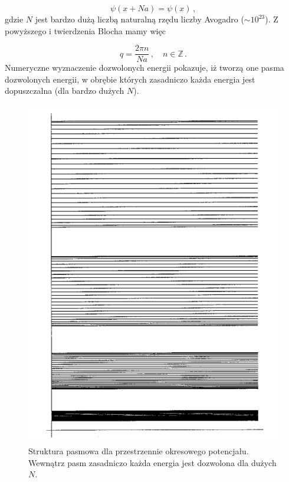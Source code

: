 \documentclass{myclass}
\begin{document}
\begin{equation*}
\psi(x+Na)=\psi(x)\,,
\end{equation*}
gdzie \(N\) jest bardzo dużą liczbą naturalną rzędu liczby Avogadro (\(\sim10^{23}\)). Z powyższego
i twierdzenia Blocha mamy więc

\begin{equation*}
q = \frac{2\pi n}{Na}\,,\quad n\in\mathbb{Z}\,.
\end{equation*}
Numeryczne wyznaczenie dozwolonych energii pokazuje, iż tworzą one pasma dozwolonych energii, w
obrębie których zasadniczo każda energia jest dopuszczalna (dla bardzo dużych \(N\)).

\begin{figure}[ht]
    \centering
    \includegraphics[scale=0.5]{figs/bands.png}
    \caption{Struktura pasmowa dla przestrzennie okresowego potencjału. Wewnątrz pasm zasadniczo każda energia jest dozwolona dla dużych \(N\).}
    \label{fig:bands}
\end{figure}
\end{document}
